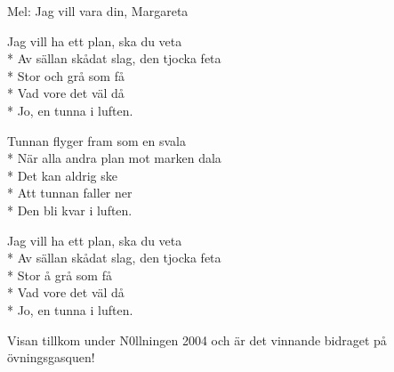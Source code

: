 \begin{SongText}
    \begin{SongInfo}
        Mel: Jag vill vara din, Margareta
    \end{SongInfo}
    \begin{SongVerse}
        Jag vill ha ett plan, ska du veta\\*%
        Av sällan skådat slag, den tjocka feta\\*%
        Stor och grå som få\\*%
        Vad vore det väl då\\*%
        Jo, en tunna i luften.
    \end{SongVerse}
    \begin{SongVerse}
        Tunnan flyger fram som en svala\\*%
        När alla andra plan mot marken dala\\*%
        Det kan aldrig ske\\*%
        Att tunnan faller ner\\*%
        Den bli kvar i luften.
    \end{SongVerse}
    \begin{SongVerse}
        Jag vill ha ett plan, ska du veta\\*%
        Av sällan skådat slag, den tjocka feta\\*%
        Stor å grå som få\\*%
        Vad vore det väl då\\*%
        Jo, en tunna i luften.
    \end{SongVerse}
    \begin{SongInfo}
        Visan tillkom under N0llningen 2004 och är det vinnande bidraget på övningsgasquen!
    \end{SongInfo}
\end{SongText}
